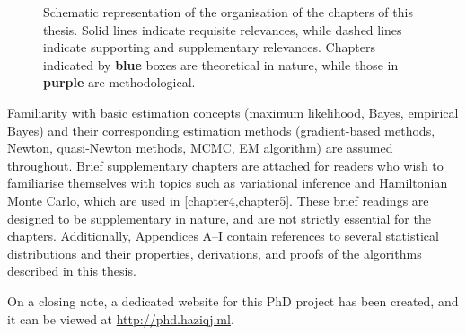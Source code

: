 \documentclass[11pt,twoside,openright,showframe]{report}
\begin{document}
\begin{figure}[hbtp]
  \caption[Schematic representation of the organisation of the chapters of this thesis]{Schematic representation of the organisation of the chapters of this thesis. Solid lines indicate requisite relevances, while dashed lines indicate supporting and supplementary relevances. Chapters indicated by \textbf{\color{lseblu} blue} boxes are theoretical in nature, while those in \textbf{\color{lsedpr} purple} are methodological.}
\end{figure}

Familiarity with basic estimation concepts (maximum likelihood, Bayes, empirical Bayes) and their corresponding estimation methods (gradient-based methods, Newton, quasi-Newton methods, MCMC, EM algorithm) are assumed throughout.
Brief supplementary chapters are attached for readers who wish to familiarise themselves with topics such as variational inference and Hamiltonian Monte Carlo, which are used in \cref{chapter4,chapter5}.
These brief readings are designed to be supplementary in nature, and are not strictly essential for the chapters.
Additionally, Appendices A--I contain references to several statistical distributions and their properties, derivations, and proofs of the algorithms described in this thesis.

On a closing note, a dedicated website for this PhD project has been created, and it can be viewed at \url{http://phd.haziqj.ml}.

\hClosingStuffStandalone
\end{document}
